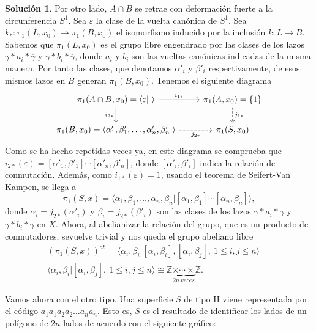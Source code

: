 \documentclass{article}
\theoremstyle{plain}
\theoremstyle{definition}
\newtheorem*{sol*}{Solución}
\providecommand{\func}[2]{\colon{#1}\longrightarrow{#2}}
\newcommand{\Z}{\mathbb{Z}}
\begin{document}
\begin{sol*}
Por otro lado, $A\cap B$ se retrae con deformación fuerte a la circunferencia $S^1$. Sea $\varepsilon$  la clase de la vuelta canónica de $S^1$. Sea $k_*\func{\pi_1(L,x_0)}{\pi_1(B,x_0)}$ el isomorfismo inducido por la inclusión $k\func{L}{B}$. Sabemos que $\pi_1(L,x_0)$ es el grupo libre engendrado por las clases de los lazos $\gamma*a_i*\overline{\gamma}$ y $\gamma*b_i*\overline{\gamma}$, donde $a_i$ y $b_i$ son las vueltas canónicas indicadas de la misma manera.  Por tanto las clases, que denotamos $\alpha'_i$ y $\beta'_i$ respectivamente, de esos mismos lazos en $B$ generan $\pi_1(B,x_0)$. Tenemos el siguiente diagrama
\[
\begin{tikzcd}
\pi_1(A\cap B,x_0)=\langle\varepsilon|\ \rangle \ar[r, "i_{1*}"]\arrow[d,"i_{2*}"'] & \pi_1(A,x_0)=\{1\}\arrow[d, dashed, "j_{1*}"]\\
\pi_1(B,x_0)=\langle \alpha'_1,\beta'_1,\dots,\alpha'_n,\beta'_n| \rangle\arrow[r,dashed,"j_{2*}"'] & \pi_1(S,x_0)
\end{tikzcd}
\]
Como se ha hecho repetidas veces ya, en este diagrama se comprueba que $i_{2*}(\varepsilon)=[\alpha'_1,\beta'_1]\cdots[\alpha'_n,\beta'_n]$, donde $[\alpha'_i,\beta'_i]$ indica la relación de conmutación. Además, como $i_{1*}(\varepsilon)=1$, usando el teorema de Seifert-Van Kampen, se llega a 
\[
\pi_1(S,x)=\langle \alpha_1,\beta_1,\dots,\alpha_n,\beta_n|[\alpha_1,\beta_1]\cdots[\alpha_n,\beta_n]\rangle,
\]
donde $\alpha_i=j_{2*}(\alpha'_i)$ y $\beta_i=j_{2*}(\beta'_i)$ son las clases de los lazos  $\gamma*a_i*\overline{\gamma}$ y $\gamma*b_i*\overline{\gamma}$ en $X$. Ahora, al abelianizar la relación del grupo, que es un producto de conmutadores, sevuelve trivial y nos queda el grupo abeliano libre
\begin{gather*}
(\pi_1(S,x))^{ab}=\langle \alpha_i, \beta_i|[\alpha_i,\beta_i],[\alpha_i,\beta_j],\ 1\leq i, j\leq n\rangle=\\
\langle \alpha_i, \beta_i|[\alpha_i,\beta_j],\ 1\leq i, j\leq n\rangle\cong\Z\underbrace{\times\cdots\times}_{2n\ veces}\Z.
\end{gather*}

Vamos ahora con el otro tipo. Una superficie $S$ de tipo II viene representada por el código $a_1 a_1 a_2 a_2\dots a_n a_n$. Esto es, $S$ es el resultado de identificar los lados de un polígono de $2n$ lados de acuerdo con el siguiente gráfico:


\end{sol*}
\end{document}

